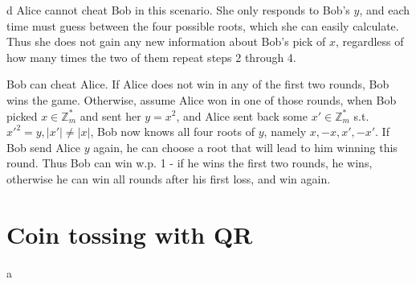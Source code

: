 \documentclass{article}
\begin{document}
\begin{paragraph}
    d Alice cannot cheat Bob in this scenario. She only responds to Bob's \(y\), and each time must guess between the four possible roots, which she can easily calculate. Thus she does not gain any new information about Bob's pick of \(x\), regardless of how many times the two of them repeat steps 2 through 4.
    
    Bob can cheat Alice. If Alice does not win in any of the first two rounds, Bob wins the game. Otherwise, assume Alice won in one of those rounds, when Bob picked \(x \in \mathbb{Z}^*_m\) and sent her \(y = x^2\), and Alice sent back some \(x' \in \mathbb{Z}^*_m\) s.t. \(x'^2 = y, |x'| \neq |x|\), Bob now knows all four roots of \(y\), namely \(x, -x, x', -x'\). If Bob send Alice \(y\) again, he can choose a root that will lead to him winning this round. Thus Bob can win w.p. 1 - if he wins the first two rounds, he wins, otherwise he can win all rounds after his first loss, and win again.
\end{paragraph}

\section{Coin tossing with QR}
\begin{paragraph}
    a 
\end{paragraph}
\end{document}
